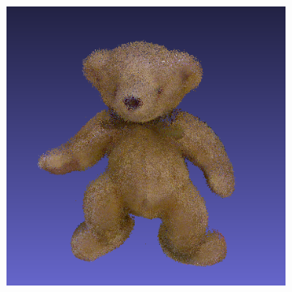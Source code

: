 \documentclass[letterpaper, 10 pt, conference]{ieeeconf}  %
\begin{document}
\begin{figure}[th]
\begin{subfigure}[b]{0.5\linewidth}
                \includegraphics[width=\linewidth]{../models/bear.png}
        \end{subfigure}
        

\end{figure}
\end{document}
